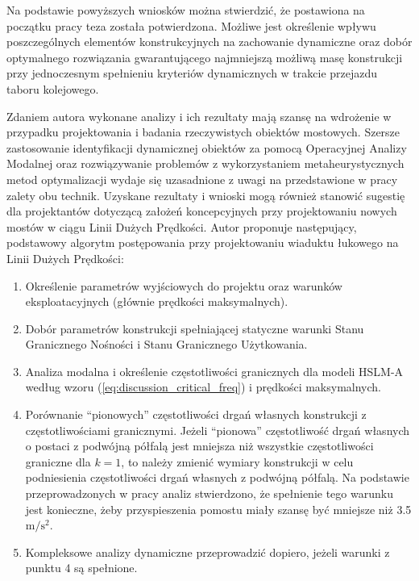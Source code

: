 Na podstawie powyższych wniosków można stwierdzić, że postawiona na początku pracy teza została potwierdzona. Możliwe jest określenie wpływu poszczególnych elementów konstrukcyjnych na zachowanie dynamiczne oraz dobór optymalnego rozwiązania gwarantującego najmniejszą możliwą masę konstrukcji przy jednoczesnym spełnieniu kryteriów dynamicznych w trakcie przejazdu taboru kolejowego.

Zdaniem autora wykonane analizy i ich rezultaty mają szansę na wdrożenie w przypadku projektowania i badania rzeczywistych obiektów mostowych. Szersze zastosowanie identyfikacji dynamicznej obiektów za pomocą Operacyjnej Analizy Modalnej oraz rozwiązywanie problemów z wykorzystaniem metaheurystycznych metod optymalizacji wydaje się uzasadnione z uwagi na przedstawione w pracy zalety obu technik. Uzyskane rezultaty i wnioski mogą również stanowić sugestię dla projektantów dotyczącą założeń koncepcyjnych przy projektowaniu nowych mostów w ciągu Linii Dużych Prędkości. Autor proponuje następujący, podstawowy algorytm postępowania przy projektowaniu wiaduktu łukowego na Linii Dużych Prędkości:
\begin{enumerate}

\item Określenie parametrów wyjściowych do projektu oraz warunków eksploatacyjnych (głównie prędkości maksymalnych).

\item Dobór parametrów konstrukcji spełniającej statyczne warunki Stanu Granicznego Nośności i Stanu Granicznego Użytkowania.

\item Analiza modalna i określenie częstotliwości granicznych dla modeli HSLM-A według wzoru (\ref{eq:discussion_critical_freq}) i prędkości maksymalnych.

\item Porównanie \enquote{pionowych} częstotliwości drgań własnych konstrukcji z częstotliwościami granicznymi. Jeżeli \enquote{pionowa} częstotliwość drgań własnych o postaci z podwójną półfalą jest mniejsza niż wszystkie częstotliwości graniczne dla $k=1$, to należy zmienić wymiary konstrukcji w celu podniesienia częstotliwości drgań własnych z podwójną półfalą. Na podstawie przeprowadzonych w pracy analiz stwierdzono, że spełnienie tego warunku jest konieczne, żeby przyspieszenia pomostu miały szansę być mniejsze niż 3.5 $\mathrm{m/s^2}$.

\item Kompleksowe analizy dynamiczne przeprowadzić dopiero, jeżeli warunki z punktu 4 są spełnione.

\end{enumerate}
